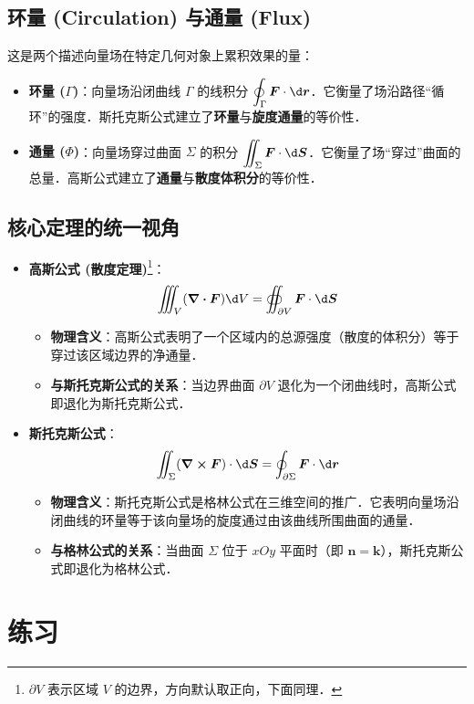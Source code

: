 \documentclass[12pt, a4paper, oneside, UTF8]{ctexbook}
\begin{document}
\subsection{环量 (Circulation) 与通量 (Flux)}
这是两个描述向量场在特定几何对象上累积效果的量：
\begin{itemize}
    \item \textbf{环量 ($\Gamma$)}：向量场沿闭曲线 $\Gamma$ 的线积分 $\displaystyle\oint_\Gamma \bm{F} \cdot \d \bm{r}$．它衡量了场沿路径“循环”的强度．斯托克斯公式建立了\textbf{环量}与\textbf{旋度通量}的等价性．
    \item \textbf{通量 ($\Phi$)}：向量场穿过曲面 $\Sigma$ 的积分 $\displaystyle\iint_\Sigma \bm{F} \cdot \d \bm{S}$．它衡量了场“穿过”曲面的总量．高斯公式建立了\textbf{通量}与\textbf{散度体积分}的等价性．
\end{itemize}

\subsection{核心定理的统一视角}
\begin{itemize}
    \item \textbf{高斯公式 (散度定理)}\footnote{$\partial V$ 表示区域 $V$ 的边界，方向默认取正向，下面同理．}：$$\iiint_V (\div \bm{F}) \d V = \oiint_{\partial V} \bm{F} \cdot \d \bm{S} $$
    \begin{itemize}
        \item \textbf{物理含义}：高斯公式表明了一个区域内的总源强度（散度的体积分）等于穿过该区域边界的净通量．
        \item \textbf{与斯托克斯公式的关系}：当边界曲面 $\partial V$ 退化为一个闭曲线时，高斯公式即退化为斯托克斯公式．
    \end{itemize}
    \item \textbf{斯托克斯公式}：$$\iint_\Sigma (\curl \bm{F}) \cdot \d \bm{S} = \oint_{\partial \Sigma} \bm{F} \cdot \d \bm{r} $$
    \begin{itemize}
    \item \textbf{物理含义}：斯托克斯公式是格林公式在三维空间的推广．它表明向量场沿闭曲线的环量等于该向量场的旋度通过由该曲线所围曲面的通量．
    \item \textbf{与格林公式的关系}：当曲面 $\Sigma$ 位于 $xOy$ 平面时（即 $\bm{n} = \bm{k}$），斯托克斯公式即退化为格林公式．
    \end{itemize}
\end{itemize}
\section{练习}
\end{document}

